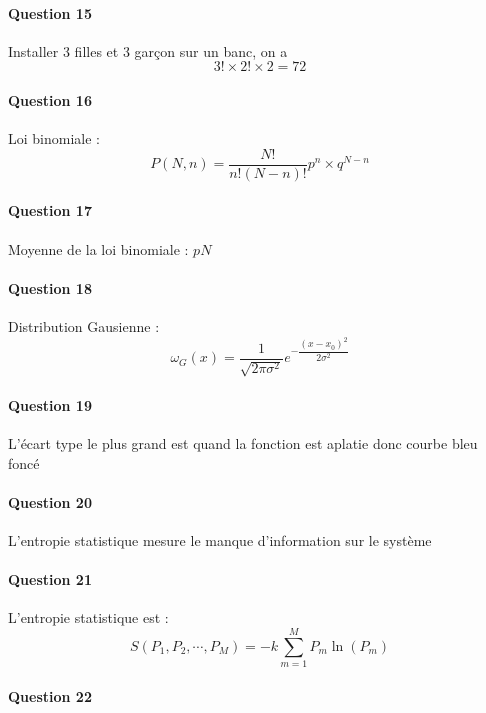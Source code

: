 \documentclass[12pt,a4paper]{report}
\begin{document}
\paragraph{Question 15}

Installer 3 filles et 3 garçon sur un banc, on a 
\[
	3! \times 2! \times 2 = 72 
\]

\paragraph{Question 16}

Loi binomiale :
\[
	P(N, n) = \dfrac{N!}{n!(N-n)!} p^n \times q^{N-n}
\]

\paragraph{Question 17}

Moyenne de la loi binomiale : \(pN\)

\paragraph{Question 18}

Distribution Gausienne :
\[
	\omega_G(x) = \dfrac{1}{\sqrt{2\pi \sigma^2}} e^{-\dfrac{(x - x_0)^2}{2\sigma^2}}
\]

\paragraph{Question 19}

L'écart type le plus grand est quand la fonction est aplatie donc courbe bleu foncé

\paragraph{Question 20}

L'entropie statistique mesure le manque d'information sur le système

\paragraph{Question 21}

L'entropie statistique est :
\[
	S(P_1, P_2, \cdots, P_M) = -k \sum_{m=1}^M P_m \ln(P_m)
\]

\paragraph{Question 22}
\end{document}
